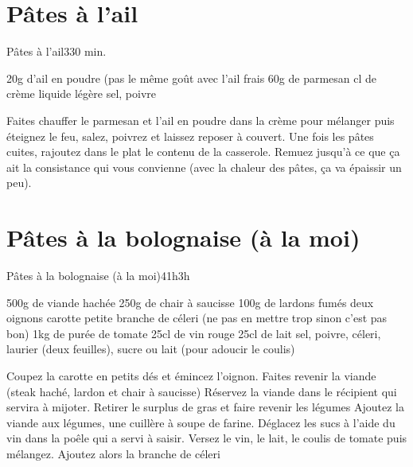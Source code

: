 {\section{Pâtes à l'ail}
\begin{recette}{Pâtes à l'ail}{3}{30 min.}{}
\begin{ingredients}
\ingredient 20g d'ail en poudre (pas le même  goût avec l'ail frais
\ingredient 60g de parmesan
 cl de crème liquide légère 
\ingredient sel, poivre
\end{ingredients}


\begin{preparation}
\etape Faites chauffer le parmesan et l'ail en poudre dans la crème pour mélanger puis éteignez le feu, salez, poivrez et laissez reposer à couvert.
\etape Une fois les pâtes cuites, rajoutez dans le plat le contenu de la casserole. Remuez jusqu'à ce que ça ait la consistance qui vous convienne (avec la chaleur des pâtes, ça va épaissir un peu).
\end{preparation}
\end{recette}

\section{Pâtes à la bolognaise (à la moi)}
\begin{recette}{Pâtes à la bolognaise (à la moi)}{4}{1h}{3h}
\begin{ingredients}
\ingredient 500g de viande hachée
\ingredient 250g de chair à saucisse
\ingredient 100g de lardons fumés
\ingredient deux oignons
 carotte
 petite branche de céleri (ne pas en mettre trop sinon c'est pas bon)
\ingredient 1kg de purée de tomate
\ingredient 25cl de vin rouge
\ingredient 25cl de lait
\ingredient sel, poivre, céleri, laurier (deux feuilles), sucre ou lait (pour adoucir le coulis)
\end{ingredients}

\begin{preparation}
\etape Coupez la carotte en petits dés et émincez l'oignon.
\etape Faites revenir la viande (steak haché, lardon et chair à saucisse)
\etape Réservez la viande dans le récipient qui servira à mijoter. 
\etape Retirer le surplus de gras et faire revenir les légumes
\etape Ajoutez la viande aux légumes, une cuillère à soupe de farine.
\etape Déglacez les sucs à l'aide du vin dans la poêle qui a servi à saisir. 
\etape Versez le vin, le lait, le coulis de tomate puis mélangez. Ajoutez alors la branche de céleri
\end{preparation}



\end{recette}}
